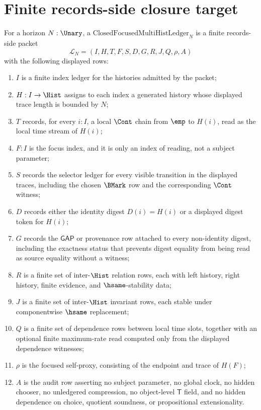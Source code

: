 \section{Finite records-side closure target}
\label{sec:consciousness-universe-finite-closure-target}

\begin{definition}
\label{def:closed-focused-multihist-ledger}
For a horizon $N:\Unary$, a $\mathrm{ClosedFocusedMultiHistLedger}_N$ is a finite records-side packet
$$
\mathcal{L}_N=(I,H,T,F,S,D,G,R,J,Q,\rho,A)
$$
with the following displayed rows:
\begin{enumerate}
\item $I$ is a finite index ledger for the histories admitted by the packet;
\item $H:I\to\Hist$ assigns to each index a generated history whose displayed trace length is bounded by $N$;
\item $T$ records, for every $i:I$, a local $\Cont$ chain from $\emp$ to $H(i)$, read as the local time stream of $H(i)$;
\item $F:I$ is the focus index, and it is only an index of reading, not a subject parameter;
\item $S$ records the selector ledger for every visible transition in the displayed traces, including the chosen $\BMark$ row and the corresponding $\Cont$ witness;
\item $D$ records either the identity digest $D(i)=H(i)$ or a displayed digest token for $H(i)$;
\item $G$ records the $\mathsf{GAP}$ or provenance row attached to every non-identity digest, including the exactness status that prevents digest equality from being read as source equality without a witness;
\item $R$ is a finite set of inter-$\Hist$ relation rows, each with left history, right history, finite evidence, and $\hsame$-stability data;
\item $J$ is a finite set of inter-$\Hist$ invariant rows, each stable under componentwise $\hsame$ replacement;
\item $Q$ is a finite set of dependence rows between local time slots, together with an optional finite maximum-rate read computed only from the displayed dependence witnesses;
\item $\rho$ is the focused self-proxy, consisting of the endpoint and trace of $H(F)$;
\item $A$ is the audit row asserting no subject parameter, no global clock, no hidden chooser, no unledgered compression, no object-level $\mathsf{T}$ field, and no hidden dependence on choice, quotient soundness, or propositional extensionality.
\end{enumerate}
\end{definition}

